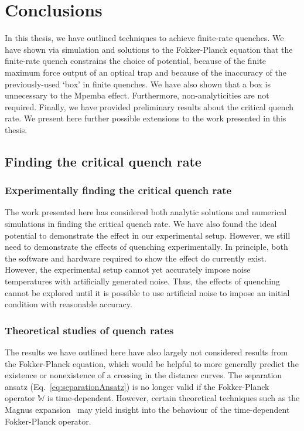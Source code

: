 \documentclass[hyperref={colorlinks=true, urlcolor=blue, citecolor=blue, final, bound}]{sfuthesis}
\begin{document}
\chapter{Conclusions}
In this thesis, we have outlined techniques to achieve finite-rate quenches. We have shown via simulation and solutions to the Fokker-Planck equation that the finite-rate quench constrains the choice of potential, because of the finite maximum force output of an optical trap and because of the inaccuracy of the previously-used `box' in finite quenches. We have also shown that a box is unnecessary to the Mpemba effect. Furthermore, non-analyticities are not required. Finally, we have provided preliminary results about the critical quench rate. We present here further possible extensions to the work presented in this thesis.

\section{Finding the critical quench rate}
\subsection{Experimentally finding the critical quench rate}
The work presented here has considered both analytic solutions and numerical simulations in finding the critical quench rate. We have also found the ideal potential to demonstrate the effect in our experimental setup. However, we still need to demonstrate the effects of quenching experimentally. In principle, both the software and hardware required to show the effect do currently exist. However, the experimental setup cannot yet accurately impose noise temperatures with artificially generated noise. Thus, the effects of quenching cannot be explored until it is possible to use artificial noise to impose an initial condition with reasonable accuracy.

\subsection{Theoretical studies of quench rates}
The results we have outlined here have also largely not considered results from the Fokker-Planck equation, which would be helpful to more generally predict the existence or nonexistence of a crossing in the distance curves. The separation ansatz (Eq.~\ref{eq:separationAnsatz}) is no longer valid if the Fokker-Planck operator $\mathbb W$ is time-dependent. However, certain theoretical techniques such as the Magnus expansion~\cite{Blanes2010} may yield insight into the behaviour of the time-dependent Fokker-Planck operator.
\end{document}
